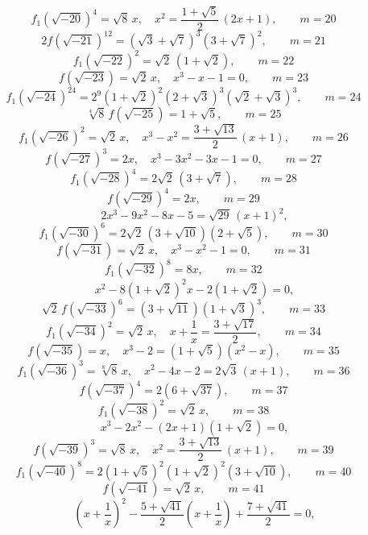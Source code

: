 
\[ f_1(\sqrt{-20})^4 = \sqrt8\,x, \quad x^2 = \frac{1+\sqrt5}{2}\,(2x+1), \qquad m = 20 \]
\[ 2f(\sqrt{-21})^{12} = (\sqrt3+\sqrt7)^3(3+\sqrt7)^2, \qquad m = 21 \]
\[ f_1(\sqrt{-22})^2 = \sqrt2\,(1+\sqrt2), \qquad m = 22 \]
\[ f(\sqrt{-23}) = \sqrt2\,x, \quad x^3 - x - 1 = 0, \qquad m = 23 \]
\[ f_1(\sqrt{-24})^{24} = 2^9(1+\sqrt2)^2(2+\sqrt3)^3(\sqrt2+\sqrt3)^3, \qquad m = 24 \]
\[ \sqrt[4]{8}\,f(\sqrt{-25}) = 1 + \sqrt5, \qquad m = 25 \]
\[ f_1(\sqrt{-26})^2 = \sqrt2\,x, \quad x^3 - x^2 = \frac{3+\sqrt{13}}{2}\,(x+1), \qquad m = 26 \]
\[ f(\sqrt{-27})^3 = 2x, \quad x^3 - 3x^2 - 3x - 1 = 0, \qquad m = 27 \]
\[ f_1(\sqrt{-28})^4 = 2\sqrt2\,(3+\sqrt7), \qquad m = 28 \]
\[ f(\sqrt{-29})^4 = 2x, \qquad m = 29 \]
\[ \qquad 2x^3 - 9x^2 - 8x - 5 = \sqrt{29}\,(x+1)^2, \]
\[ f_1(\sqrt{-30})^6 = 2\sqrt2\,(3+\sqrt{10})(2+\sqrt5), \qquad m = 30 \]
\[ f(\sqrt{-31}) = \sqrt2\,x, \quad x^3 - x^2 - 1 = 0, \qquad m = 31 \]
\[ f_1(\sqrt{-32})^8 = 8x, \qquad m = 32 \]
\[ \qquad x^2 - 8(1+\sqrt2)^2 x - 2(1+\sqrt2) = 0, \]
\[ \sqrt2\,f(\sqrt{-33})^6 = (3+\sqrt{11})(1+\sqrt3)^3, \qquad m = 33 \]
\[ f_1(\sqrt{-34})^2 = \sqrt2\,x, \quad x + \frac{1}{x} = \frac{3+\sqrt{17}}{2}, \qquad m = 34 \]
\[ f(\sqrt{-35}) = x, \quad x^3 - 2 = (1+\sqrt5)(x^2-x), \qquad m = 35 \]
\[ f_1(\sqrt{-36})^3 = \sqrt[8]{8}\,x, \quad x^2 - 4x - 2 = 2\sqrt3\,(x+1), \qquad m = 36 \]
\[ f(\sqrt{-37})^4 = 2(6+\sqrt{37}), \qquad m = 37 \]
\[ f_1(\sqrt{-38})^2 = \sqrt2\,x, \qquad m = 38 \]
\[ \qquad x^3 - 2x^2 - (2x+1)(1+\sqrt2) = 0, \]
\[ f(\sqrt{-39})^3 = \sqrt8\,x, \quad x^2 = \frac{3+\sqrt{13}}{2}\,(x+1), \qquad m = 39 \]
\[ f_1(\sqrt{-40})^8 = 2(1+\sqrt5)^2(1+\sqrt2)^2(3+\sqrt{10}), \qquad m = 40 \]
\[ f(\sqrt{-41}) = \sqrt2\,x, \qquad m = 41 \]
\[ \qquad \left(x+\frac{1}{x}\right)^2 - \frac{5+\sqrt{41}}{2}\left(x+\frac{1}{x}\right) + \frac{7+\sqrt{41}}{2} = 0, \]
